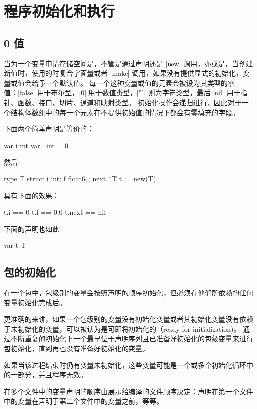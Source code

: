 \chapter{程序初始化和执行}

\section{0 值}
当为一个变量申请存储空间是，不管是通过声明还是 \code|new| 调用，亦或是，当创建新值时，使用的时复合字面量或者 \code|make| 调用，如果没有提供显式的初始化，变量或值会给予一个默认值。
每一个这种变量或值的元素会被设为其类型的零值：\code|false| 用于布尔型，\code|0| 用于数值类型，\code|""| 则为字符类型，最后 \code|nil| 用于指针、函数、接口、切片、通道和映射类型。
初始化操作会递归进行，因此对于一个结构体数组中的每一个元素在不提供初始值的情况下都会有零填充的字段。

下面两个简单声明是等价的：
\begin{golang}
var i int
var i int = 0
\end{golang}
然后
\begin{golang}
type T struct { i int; f float64; next *T }
t := new(T)
\end{golang}
具有下面的效果：
\begin{golang}
t.i == 0
t.f == 0.0
t.next == nil
\end{golang}
下面的声明也如此
\begin{golang}
var t T
\end{golang}

\section{包的初始化}
在一个包中，包级别的变量会按照声明的顺序初始化，但必须在他们所依赖的任何变量初始化完成后。

更准确的来讲，如果一个包级别的变量没有初始化变量或者其初始化变量没有依赖于未初始化的变量，可以被认为是可即将初始化的（ready for initialization)。
通过不断重复的初始化下一个最早位于声明序列且已准备好初始化的包级变量来进行包初始化，直到再也没有准备好初始化的变量。

如果当该过程结束时仍有变量未初始化，这些变量可能是一个或多个初始化循环中的一部分，并且程序无效。

在多个文件中的变量声明的顺序由展示给编译的文件顺序决定：声明在第一个文件中的变量在声明于第二个文件中的变量之前，等等。


